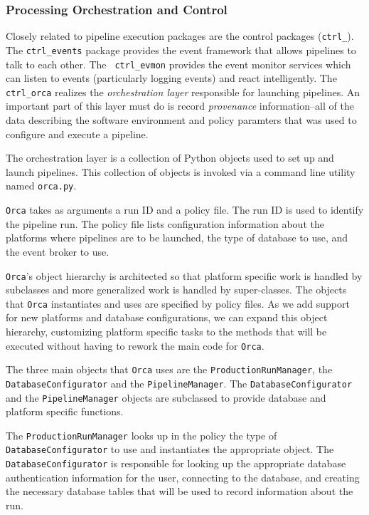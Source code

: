 
\subsubsection{Processing Orchestration and Control}

Closely related to pipeline execution packages are the control
packages ({\tt ctrl\_}).  The {\tt ctrl\_events} package provides the
event framework that allows pipelines to talk to each other.  The {\tt
ctrl\_evmon} provides the event monitor services which can listen to
events (particularly logging events) and react intelligently.  The
{\tt ctrl\_orca} realizes the {\it orchestration layer} responsible
for launching pipelines.  An important part of this layer must do is
record {\it provenance} information--all of the data describing the
software environment and policy paramters that was used to configure
and execute a pipeline.  

 \label{sec:PipelineOrchestration}

The orchestration layer is a collection of Python objects used to set up and
launch pipelines. This collection of objects is invoked via a command line
utility named \texttt{orca.py}.

\texttt{Orca} takes as arguments a run ID and a policy file. The run ID is used
to identify the pipeline run. The policy file lists configuration information
about the platforms where pipelines are to be launched, the type of database to
use, and the event broker to use.

\texttt{Orca}'s object hierarchy is architected so that platform specific work
is handled by subclasses and more generalized work is handled by super-classes.
The objects that \texttt{Orca} instantiates and uses are specified by policy
files. As we add support for new platforms and database configurations, we can
expand this object hierarchy, customizing platform specific tasks to the methods
that will be executed without having to rework the main code for \texttt{Orca}.

The three main objects that \texttt{Orca} uses are the
\texttt{ProductionRunManager}, the \texttt{DatabaseConfig\-urator} and the
\texttt{PipelineManager}.  The \texttt{DatabaseConfigurator} and the
\texttt{PipelineManager} objects are subclassed to provide database and platform
specific functions.

The \texttt{ProductionRunManager} looks up in the policy the type of
\texttt{DatabaseConfigurator} to use and instantiates the appropriate object.
The \texttt{DatabaseConfigurator} is responsible for looking up the appropriate
database authentication information for the user, connecting to the database,
and creating the necessary database tables that will be used to record
information about the run.

